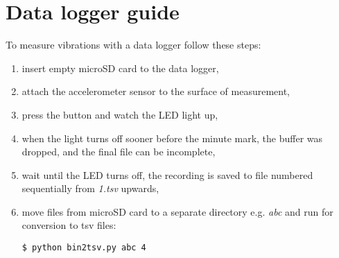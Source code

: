 \section{Data logger guide}
To measure vibrations with a data logger follow these steps:

\begin{enumerate}[noitemsep]
\item insert empty microSD card to the data logger,
\item attach the accelerometer sensor to the surface of measurement,
\item press the button and watch the LED light up,
\item when the light turns off sooner before the minute mark, the buffer was dropped, and the final file can be incomplete,
\item wait until the LED turns off, the recording is saved to file numbered sequentially from \emph{1.tsv} upwards,
\item {move files from microSD card to a separate directory e.g. \emph{abc} and run for conversion to tsv files:
\begin{lstlisting}[style=messages]
$ python bin2tsv.py abc 4
\end{lstlisting}}
\end{enumerate}